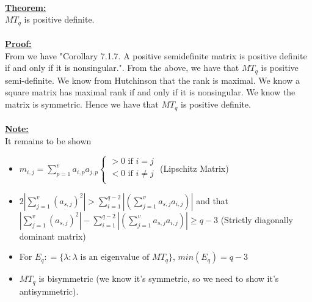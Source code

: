 \documentclass[11pt]{article}
\theoremstyle{plain}
\theoremstyle{definition}
\begin{document}
\\	
\textbf{\underline{Theorem:}}\\ $MT_q$ is positive definite.\\
\\
\textbf{\underline{Proof:}}\\
From \cite{Horn:2012:MA:2422911} we have "Corollary 7.1.7. A positive semidefinite matrix is positive definite if and only if it is nonsingular.". From the above, we have that $MT_q$ is positive semi-definite. We know from Hutchinson \cite{1107.0264} that the rank is maximal. We know a square matrix has maximal rank if and only if it is nonsingular. We know the matrix is symmetric. Hence we have that $MT_q$ is positive definite.\\
\\
\textbf{\underline{Note:}} \\
It remains to be shown
\begin{itemize}
	\item $
	m_{i,j} = \sum\limits_{p=1}^{v} a_{i,p} a_{j, p} 
	\begin{cases}
	> 0\text{ if }i = j \\
	< 0\text{ if }i \neq j\\
	\end{cases}
	$ (Lipschitz Matrix)
	\item $2 | \sum\limits_{j=1}^{v} ( a_{s,j} )^2 | > \sum\limits_{i=1}^{q-2} | ( \sum\limits_{j=1}^{v} a_{s,j} a_{i,j} ) |$ and that $ | \sum\limits_{j=1}^{v} ( a_{s,j} )^2 | - \sum\limits_{i=1}^{q-2} | ( \sum\limits_{j=1}^{v} a_{s,j} a_{i,j} ) | \geq q-3$ (Strictly diagonally dominant matrix)
	\item For $E_q : = \{\lambda : \lambda \text{ is an eigenvalue of }MT_q \}$, $min(E_q) = q-3$
	\item $MT_q$ is bisymmetric (we know it's symmetric, so we need to show it's antisymmetric).
\end{itemize}
\pagebreak
\end{document}
